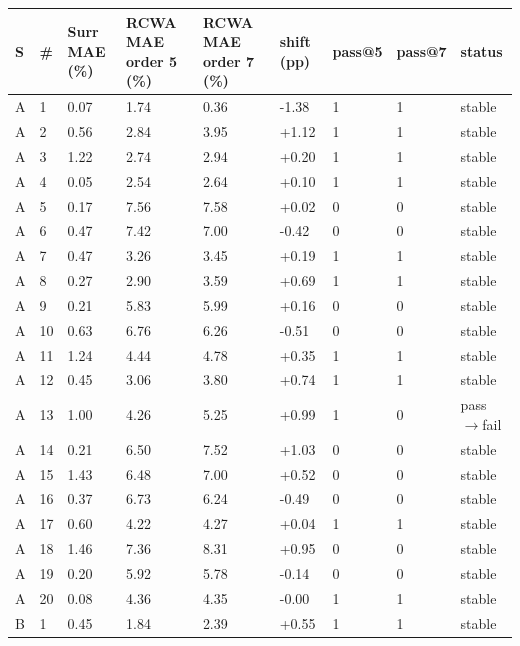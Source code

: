 \documentclass[11pt,a4paper]{article}
\newcounter{none}   %
\begin{document}
\begin{landscape}
\begingroup
\setlength{\tabcolsep}{3pt}\footnotesize
{}
\label{tab:3}
{\def\LTcaptype{none} %
\begin{longtable}[]{@{}lllllllll@{}}
\toprule\noalign{}
S & \# & Surr MAE (\%) & RCWA MAE order 5 (\%) & RCWA MAE order 7 (\%) & shift (pp) & pass@5 & pass@7 & status \\
\midrule\noalign{}
\endhead
\bottomrule\noalign{}
\endlastfoot
A & 1 & 0.07 & 1.74 & 0.36 & -1.38 & 1 & 1 & stable \\
A & 2 & 0.56 & 2.84 & 3.95 & +1.12 & 1 & 1 & stable \\
A & 3 & 1.22 & 2.74 & 2.94 & +0.20 & 1 & 1 & stable \\
A & 4 & 0.05 & 2.54 & 2.64 & +0.10 & 1 & 1 & stable \\
A & 5 & 0.17 & 7.56 & 7.58 & +0.02 & 0 & 0 & stable \\
A & 6 & 0.47 & 7.42 & 7.00 & -0.42 & 0 & 0 & stable \\
A & 7 & 0.47 & 3.26 & 3.45 & +0.19 & 1 & 1 & stable \\
A & 8 & 0.27 & 2.90 & 3.59 & +0.69 & 1 & 1 & stable \\
A & 9 & 0.21 & 5.83 & 5.99 & +0.16 & 0 & 0 & stable \\
A & 10 & 0.63 & 6.76 & 6.26 & -0.51 & 0 & 0 & stable \\
A & 11 & 1.24 & 4.44 & 4.78 & +0.35 & 1 & 1 & stable \\
A & 12 & 0.45 & 3.06 & 3.80 & +0.74 & 1 & 1 & stable \\
A & 13 & 1.00 & 4.26 & 5.25 & +0.99 & 1 & 0 & pass\ensuremath{\rightarrow}fail \\
A & 14 & 0.21 & 6.50 & 7.52 & +1.03 & 0 & 0 & stable \\
A & 15 & 1.43 & 6.48 & 7.00 & +0.52 & 0 & 0 & stable \\
A & 16 & 0.37 & 6.73 & 6.24 & -0.49 & 0 & 0 & stable \\
A & 17 & 0.60 & 4.22 & 4.27 & +0.04 & 1 & 1 & stable \\
A & 18 & 1.46 & 7.36 & 8.31 & +0.95 & 0 & 0 & stable \\
A & 19 & 0.20 & 5.92 & 5.78 & -0.14 & 0 & 0 & stable \\
A & 20 & 0.08 & 4.36 & 4.35 & -0.00 & 1 & 1 & stable \\
B & 1 & 0.45 & 1.84 & 2.39 & +0.55 & 1 & 1 & stable \\

\end{longtable}}
\end{landscape}
\end{document}
